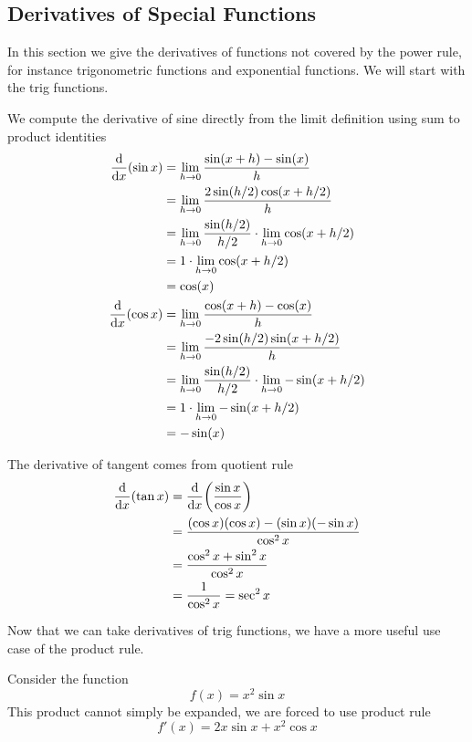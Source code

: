 \newpage 
\subsection{Derivatives of Special Functions}
In this section we give the derivatives of functions not covered by the power rule, for instance trigonometric functions and exponential functions. We will start with the trig functions.

We compute the derivative of sine directly from the limit definition using sum to product identities
\begin{align*}
	\dv{x} (\sin x) &= \lim_{h \to 0} \frac{\sin(x + h) - \sin(x)}{h} \\
	&= \lim_{h \to 0} \frac{2\sin(h/2)\cos(x + h/2)}{h} \\
	&= \lim_{h \to 0} \frac{\sin(h/2)}{h/2} \cdot \lim_{h \to 0} \cos(x + h/2) \\
	&= 1 \cdot \lim_{h \to 0} \cos(x + h/2) \\
	&= \cos(x) \\
	\dv{x} (\cos x) &= \lim_{h \to 0} \frac{\cos(x + h) - \cos(x)}{h} \\
	&= \lim_{h \to 0} \frac{-2\sin(h/2)\sin(x + h/2)}{h} \\
	&= \lim_{h \to 0} \frac{\sin(h/2)}{h/2} \cdot \lim_{h \to 0} -\sin(x + h/2) \\
	&= 1 \cdot \lim_{h \to 0} -\sin(x + h/2) \\
	&= -\sin(x) 
\end{align*}

The derivative of tangent comes from quotient rule
\begin{align*}
	\dv{x} (\tan x) &= \dv{x} \qty(\frac{\sin x}{\cos x}) \\
	&= \frac{(\cos x)(\cos x) - (\sin x)(-\sin x)}{\cos^2 x} \\
	&= \frac{\cos^2 x + \sin^2 x}{\cos^2 x} \\
	&= \frac{1}{\cos^2 x} = \sec^2 x 
\end{align*}

Now that we can take derivatives of trig functions, we have a more useful use case of the product rule.
\begin{example}
	Consider the function
	\[ f(x) = x^2 \sin x \]
	This product cannot simply be expanded, we are forced to use product rule
	\[ f'(x) = 2x \sin x + x^2 \cos x \]
\end{example}

